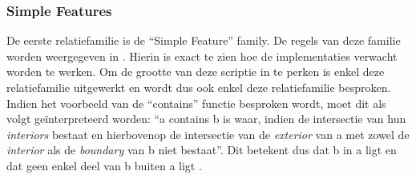 \subsubsection{Simple Features}
\label{subsubsec:simple_features}
De eerste relatiefamilie is de ``Simple Feature'' family. De regels van deze familie worden weergegeven in . Hierin is exact te zien hoe de implementaties verwacht worden te werken. Om de grootte van deze scriptie in te perken is enkel deze relatiefamilie uitgewerkt en wordt dus ook enkel deze relatiefamilie besproken. Indien het voorbeeld van de ``contains'' functie besproken wordt, moet dit als volgt geïnterpreteerd worden: ``a contains b is waar, indien de intersectie van hun \textit{interiors} bestaat en hierbovenop de intersectie van de \textit{exterior} van a met zowel de \textit{interior} als de \textit{boundary} van b niet bestaat''. Dit betekent dus dat b in a ligt en dat geen enkel deel van b buiten a ligt \cite{ogcdocs}.


